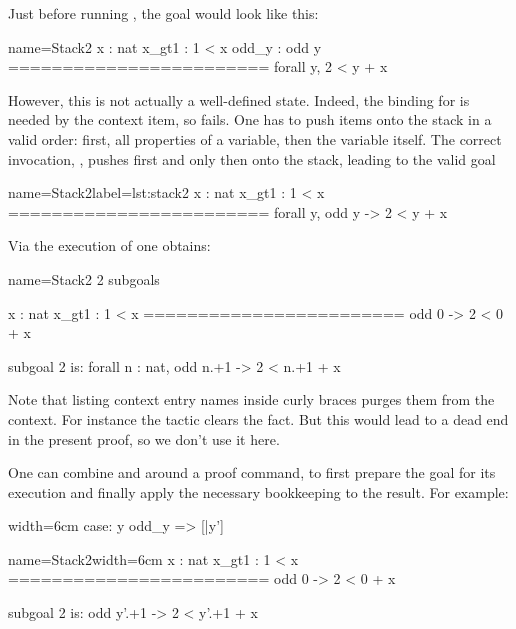 Just before running , the goal would look like this:

\begin{coqout}{name=Stack2}{}
 x : nat
 x_gt1 : 1 < x
 odd_y : odd y
 ========================
 forall y, 2 < y + x
\end{coqout}

However, this is not actually a well-defined state.
Indeed, the binding for  is needed by the 
context item, so  fails.  One has to push items onto the
stack in a valid order: first, all properties of a variable, then the
variable itself.  The correct invocation,
, pushes first  and only then  onto
the stack, leading to the valid goal

\begin{coqout}{name=Stack2}{label=lst:stack2}
 x : nat
 x_gt1 : 1 < x
 ========================
 forall y, odd y -> 2 < y + x
\end{coqout}

Via the execution of  one obtains:

\begin{coqout}{name=Stack2}{}
2 subgoals

  x : nat
  x_gt1 : 1 < x
  ========================
   odd 0 -> 2 < 0 + x

subgoal 2 is:
 forall n : nat, odd n.+1 -> 2 < n.+1 + x
\end{coqout}

Note that listing context entry names inside curly braces purges them
from the context. For instance the tactic 
clears the  fact. But this would lead to a dead end in the
present proof, so we don't use it here.


One can combine \C{:} and \C{=>} around a proof command, to first prepare the
goal for its execution and finally apply the necessary bookkeeping to the
result.  For example:

\begin{coq-left}{}{width=6cm}
case: y odd_y => [|y']
$~$
$~$
$~$
$~$
$~$
$~$
\end{coq-left}
\begin{coqout-right}{name=Stack2}{width=6cm}
  x : nat
  x_gt1 : 1 < x
  ========================
   odd 0 -> 2 < 0 + x

subgoal 2 is:
 odd y'.+1 -> 2 < y'.+1 + x
\end{coqout-right}

